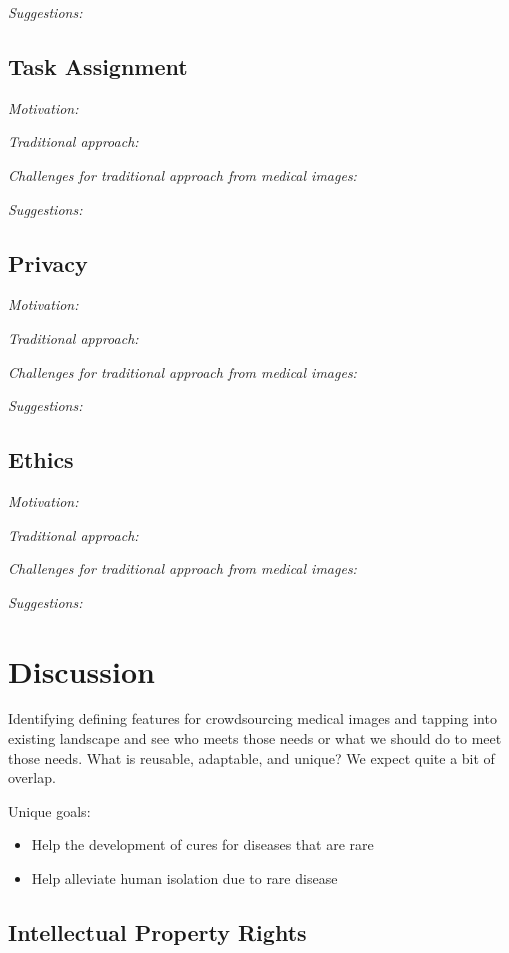 \documentclass[10pt,twocolumn,letterpaper]{article}
\begin{document}
\emph{Suggestions:}

\subsection{Task Assignment}
\emph{Motivation:} 

\emph{Traditional approach:}

\emph{Challenges for traditional approach from medical images:} 

\emph{Suggestions:}

\subsection{Privacy}
\emph{Motivation:} 

\emph{Traditional approach:}

\emph{Challenges for traditional approach from medical images:} 

\emph{Suggestions:}

\subsection{Ethics}
\emph{Motivation:} 

\emph{Traditional approach:}

\emph{Challenges for traditional approach from medical images:} 

\emph{Suggestions:}

\section{Discussion}
Identifying defining features for crowdsourcing medical images and tapping into existing landscape and see who meets those needs or what we should do to meet those needs. What is reusable, adaptable, and unique?  We expect quite a bit of overlap.  

Unique goals:
\begin{itemize}
\item Help the development of cures for diseases that are rare
\item Help alleviate human isolation due to rare disease
\end{itemize}

\subsection{Intellectual Property Rights}
\end{document}
